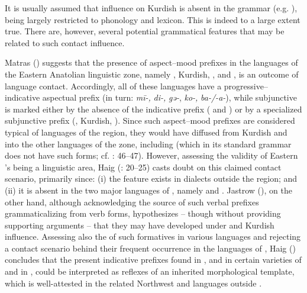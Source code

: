 \documentclass[output=paper]{langsci/langscibook}
\begin{document}
It is usually assumed that  influence on Kurdish is absent in the grammar (e.g. \citealt{Edwards1851}), being largely restricted to phonology and lexicon. This is indeed to a large extent true. There are, however, several potential grammatical features that may be related to such contact influence. 

Matras (\citeyear[75]{Matras2010}) suggests that the presence of aspect--mood prefixes in the languages of the Eastern Anatolian linguistic zone, namely , Kurdish, ,  and , is an outcome of language contact. Accordingly, all of these languages have a progressive–indicative aspectual prefix (in turn: \textit{mī-,} \textit{di-,} \textit{gǝ-}, \textit{ko-,} \textit{ba-/-a-}), while subjunctive is marked either by the absence of the indicative prefix ( and ) or by a specialized subjunctive prefix (, Kurdish, ). Since such aspect--mood prefixes are considered typical of  languages of the region, they would have diffused from Kurdish and  into the other languages of the zone, including  (which in its standard grammar does not have such forms; cf. \citealt{Ryding2014}: 46–47). However, assessing the validity of Eastern ’s being a linguistic area, Haig (\citeyear{HaigÖpengin2014}: 20–25) casts doubt on this claimed contact scenario, primarily since: (i) the feature exists in  dialects outside the region; and (ii) it is absent in the two major languages of , namely  and . Jastrow (\citeyear[92]{Jastrow2011Kurdish}), on the other hand, although acknowledging the source of such verbal prefixes grammaticalizing from   verb forms, hypothesizes – though without providing supporting arguments – that they may have developed under  and Kurdish influence. Assessing also the  of such formatives in various languages and rejecting a contact scenario behind their frequent occurrence in the languages of , Haig (\citeyear[26]{Haig2014}) concludes that the present indicative prefixes found in , and in certain varieties of  and  in , could be interpreted as reflexes of an inherited morphological template, which is well-attested in the related Northwest  and  languages outside .
\end{document}
